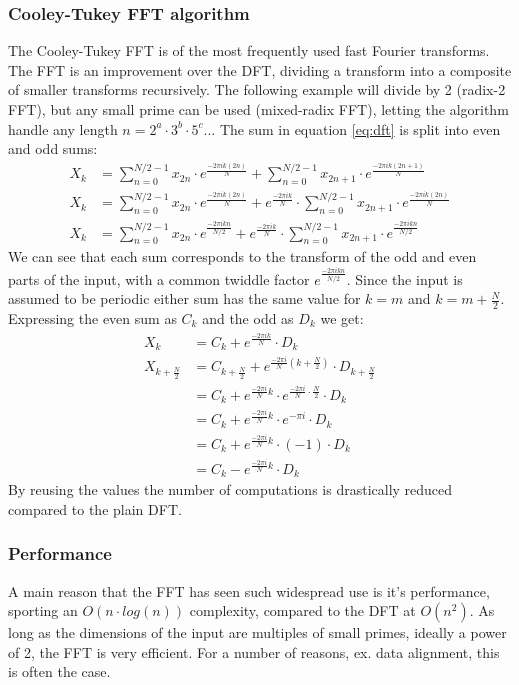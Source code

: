 \subsubsection*{Cooley-Tukey FFT algorithm}
The Cooley-Tukey FFT is of the most frequently used fast Fourier transforms. The FFT is an improvement over the DFT,
dividing a transform into a composite of smaller transforms recursively. The following example will divide by 2 (radix-2 FFT),
but any small prime can be used (mixed-radix FFT), letting the algorithm handle any length $n=2^a \cdot 3^b \cdot 5^c...$
The sum in equation \ref{eq:dft} is split into even and odd sums:
\begin{align*}
	X_k &= \sum_{n=0}^{N/2-1} x_{2n} \cdot e^{\frac{- 2\pi i k (2n)}{N}} + \sum_{n=0}^{N/2-1} x_{2n+1} \cdot e^{\frac{- 2\pi i k (2n+1)}{N}}\\
	X_k &= \sum_{n=0}^{N/2-1} x_{2n} \cdot e^{\frac{- 2\pi i k (2n)}{N}} + e^{\frac{- 2\pi i k}{N}} \cdot \sum_{n=0}^{N/2-1} x_{2n+1} \cdot e^{\frac{- 2\pi i k (2n)}{N}}\\
	X_k &= \sum_{n=0}^{N/2-1} x_{2n} \cdot e^{\frac{- 2\pi i k n}{N/2}} + e^{\frac{- 2\pi i k}{N}} \cdot \sum_{n=0}^{N/2-1} x_{2n+1} \cdot e^{\frac{- 2\pi i k n}{N/2}}
\end{align*}
	We can see that each sum corresponds to the transform of the odd and even parts of the input, with a common twiddle
	factor $e^{\frac{- 2\pi i k n}{N/2}}$. Since the input is assumed to be periodic either sum has the same value for $k=m$
	and $k=m+\frac{N}{2}$. Expressing the even sum as $C_k$ and the odd as $D_k$ we get:
\begin{align*}
	X_k &= C_k + e^{\frac{- 2\pi i k}{N}} \cdot D_k\\
	X_{k+\frac{N}{2}} &= C_{k+\frac{N}{2}} + e^{\frac{- 2\pi i}{N} (k+\frac{N}{2})} \cdot D_{k+\frac{N}{2}}\\
		&= C_k + e^{\frac{- 2\pi i}{N}k}\cdot e^{\frac{-2\pi i}{N}\cdot\frac{N}{2}} \cdot D_k\\
		&= C_k + e^{\frac{- 2\pi i}{N}k}\cdot e^{-\pi i} \cdot D_k\\
		&= C_k + e^{\frac{- 2\pi i}{N}k}\cdot (-1) \cdot D_k\\
		&= C_k - e^{\frac{- 2\pi i}{N}k}\cdot D_k
\end{align*}
 By reusing the values the number of computations is drastically reduced compared to the plain DFT.

\subsubsection*{Performance}
A main reason that the FFT has seen such widespread use is it's performance, sporting an $O\left(n\cdot log(n)\right)$
complexity, compared to the DFT at $O(n^2)$. As long as the dimensions of the input are multiples of small primes,
ideally a power of 2, the FFT is very efficient. For a number of reasons, ex. data alignment, this is often the case.

